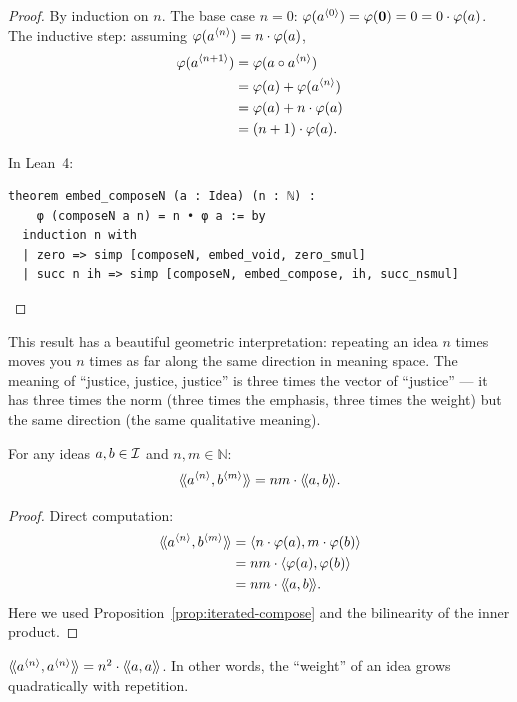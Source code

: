 \begin{proof}
By induction on $n$. The base case $n = 0$: $\varphi(a^{\langle 0 \rangle}) =
\varphi(\mathbf{0}) = 0 = 0 \cdot \varphi(a)$. The inductive step: assuming
$\varphi(a^{\langle n \rangle}) = n \cdot \varphi(a)$,
\begin{align*}
  \varphi(a^{\langle n+1 \rangle})
  &= \varphi(a \circ a^{\langle n \rangle}) \\
  &= \varphi(a) + \varphi(a^{\langle n \rangle}) \\
  &= \varphi(a) + n \cdot \varphi(a) \\
  &= (n+1) \cdot \varphi(a).
\end{align*}

In Lean~4:
\begin{lstlisting}
theorem embed_composeN (a : Idea) (n : ℕ) :
    φ (composeN a n) = n • φ a := by
  induction n with
  | zero => simp [composeN, embed_void, zero_smul]
  | succ n ih => simp [composeN, embed_compose, ih, succ_nsmul]
\end{lstlisting}
\end{proof}

This result has a beautiful geometric interpretation: repeating an idea $n$
times moves you $n$ times as far along the same direction in meaning space. The
meaning of ``justice, justice, justice'' is three times the vector of ``justice''
--- it has three times the norm (three times the emphasis, three times the
weight) but the same direction (the same qualitative meaning).

\begin{proposition}
\label{prop:resonance-iterated}
For any ideas $a, b \in \mathcal{I}$ and $n, m \in \mathbb{N}$:
\[
  \langle\!\langle a^{\langle n \rangle}, b^{\langle m \rangle} \rangle\!\rangle = nm \cdot \langle\!\langle a, b \rangle\!\rangle.
\]
\end{proposition}

\begin{proof}
Direct computation:
\begin{align*}
  \langle\!\langle a^{\langle n \rangle}, b^{\langle m \rangle} \rangle\!\rangle
  &= \langle n \cdot \varphi(a), m \cdot \varphi(b) \rangle \\
  &= nm \cdot \langle \varphi(a), \varphi(b) \rangle \\
  &= nm \cdot \langle\!\langle a, b \rangle\!\rangle.
\end{align*}
Here we used Proposition~\ref{prop:iterated-compose} and the bilinearity of the
inner product.
\end{proof}

\begin{corollary}
\label{cor:self-resonance-iterated}
$\langle\!\langle a^{\langle n \rangle}, a^{\langle n \rangle} \rangle\!\rangle = n^2 \cdot \langle\!\langle a, a \rangle\!\rangle$.
In other words, the ``weight'' of an idea grows quadratically with repetition.
\end{corollary}

